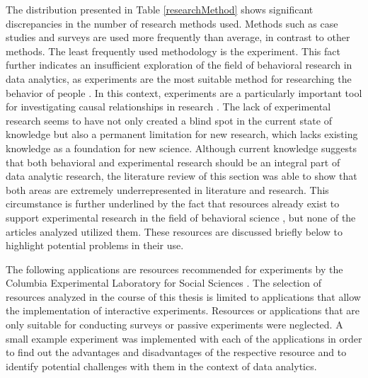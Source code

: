 The distribution presented in Table \ref{researchMethod} shows significant discrepancies in the number of research methods used. Methods such as case studies and surveys are used more frequently than average, in contrast to other methods. The least frequently used methodology is the experiment. This fact further indicates an insufficient exploration of the field of behavioral research in data analytics, as experiments are the most suitable method for researching the behavior of people \cite{Gniewosz.2011}. In this context, experiments are a particularly important tool for investigating causal relationships in research \cite{Gniewosz.2011}. The lack of experimental research seems to have not only created a blind spot in the current state of knowledge but also a permanent limitation for new research, which lacks existing knowledge as a foundation for new science. Although current knowledge suggests that both behavioral and experimental research should be an integral part of data analytic research, the literature review of this section was able to show that both areas are extremely underrepresented in literature and research. This circumstance is further underlined by the fact that resources already exist to support experimental research in the field of behavioral science \cite{Columbia.2023}, but none of the articles analyzed utilized them. These resources are discussed briefly below to highlight potential problems in their use.

The following applications are resources recommended for experiments by the Columbia Experimental Laboratory for Social Sciences \cite{Columbia.2023}. The selection of resources analyzed in the course of this thesis is limited to applications that allow the implementation of interactive experiments. Resources or applications that are only suitable for conducting surveys or passive experiments were neglected. A small example experiment was implemented with each of the applications in order to find out the advantages and disadvantages of the respective resource and to identify potential challenges with them in the context of data analytics.



